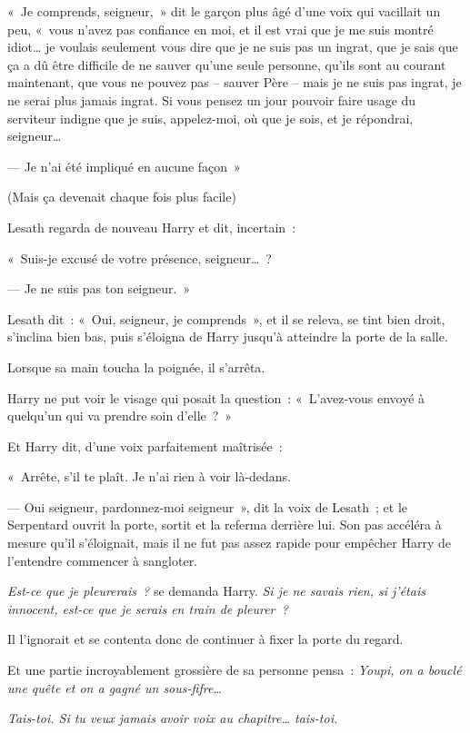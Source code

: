 «~Je comprends, seigneur,~» dit le garçon plus âgé d'une voix qui vacillait un peu, «~vous n'avez pas confiance en moi, et il est vrai que je me suis montré idiot… je voulais seulement vous dire que je ne suis pas un ingrat, que je sais que ça a dû être difficile de ne sauver qu'une seule personne, qu'ils sont au courant maintenant, que vous ne pouvez pas -- sauver Père -- mais je ne suis pas ingrat, je ne serai plus jamais ingrat. Si vous pensez un jour pouvoir faire usage du serviteur indigne que je suis, appelez-moi, où que je sois, et je répondrai, seigneur…

--- Je n'ai été impliqué en aucune façon~»

(Mais ça devenait chaque fois plus facile)

Lesath regarda de nouveau Harry et dit, incertain~:

«~Suis-je excusé de votre présence, seigneur…~?

--- Je ne suis pas ton seigneur.~»

Lesath dit~: «~Oui, seigneur, je comprends~», et il se releva, se tint bien droit, s'inclina bien bas, puis s'éloigna de Harry jusqu'à atteindre la porte de la salle.

Lorsque sa main toucha la poignée, il s'arrêta.

Harry ne put voir le visage qui posait la question~: «~L'avez-vous envoyé à quelqu'un qui va prendre soin d'elle~?~»

Et Harry dit, d'une voix parfaitement maîtrisée~:

«~Arrête, s'il te plaît. Je n'ai rien à voir là-dedans.

--- Oui seigneur, pardonnez-moi seigneur~», dit la voix de Lesath~; et le Serpentard ouvrit la porte, sortit et la referma derrière lui. Son pas accéléra à mesure qu'il s'éloignait, mais il ne fut pas assez rapide pour empêcher Harry de l'entendre commencer à sangloter.

\emph{Est-ce que je pleurerais~?} se demanda Harry. \emph{Si je ne savais rien, si j'étais innocent, est-ce que je serais en train de pleurer~?}

Il l'ignorait et se contenta donc de continuer à fixer la porte du regard.

Et une partie incroyablement grossière de sa personne pensa~: \emph{Youpi, on a bouclé une quête et on a gagné un sous-fifre…}

\emph{Tais-toi. Si tu veux jamais avoir voix au chapitre… tais-toi.}


